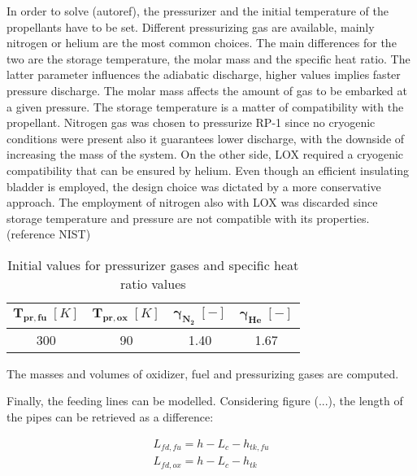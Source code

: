 In order to solve (autoref), the pressurizer and the initial temperature of the propellants have to be set. Different pressurizing gas are available, mainly nitrogen or helium are the most common choices. The main differences for the two are the storage temperature, the molar mass and the specific heat ratio. The latter parameter influences the adiabatic discharge, higher values implies faster pressure discharge. The molar mass affects the amount of gas to be embarked at a given pressure. The storage temperature is a matter of compatibility with the propellant. Nitrogen gas was chosen to pressurize RP-1 since no cryogenic conditions were present also it guarantees lower discharge, with the downside of increasing the mass of the system. On the other side, LOX required a cryogenic compatibility that can be ensured by helium. Even though an efficient insulating bladder is employed, the design choice was dictated by a more conservative approach.
The employment of nitrogen also with LOX was discarded since storage temperature and pressure are not compatible with its properties. (reference NIST)
\begin{table}[H]
    \renewcommand{\arraystretch}{1.2}
    \centering
    \begin{tabular}{|c|c|c|c|}
        \hline
        $\boldsymbol{T_{pr,fu}} \; [K]$ & $\boldsymbol{T_{pr,ox}} \; [K]$ & $\boldsymbol{\gamma_{N_2}} \; [-]$  & $\boldsymbol{\gamma_{He}} \; [-]$ \\
        \hline
        \hline
        300 & 90 & 1.40 & 1.67 \\
        \hline
    \end{tabular}
    \caption{Initial values for pressurizer gases and specific heat ratio values}
    \label{table:press_value}
\end{table}

The masses and volumes of oxidizer, fuel and pressurizing gases are computed. 


Finally, the feeding lines can be modelled. Considering figure (...), the length of the pipes can be retrieved as a difference:

\begin{gather}
    L_{fd,fu} = h - L_c - h_{tk,fu} \\
    L_{fd,ox} = h - L_c - h_{tk}
\end{gather}

